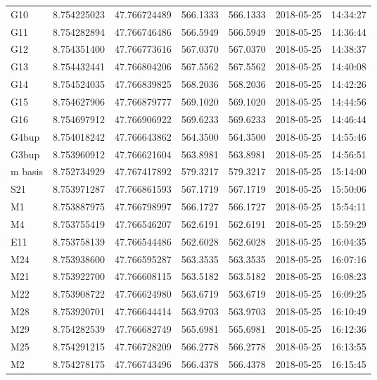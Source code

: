 \begin{table}[!ht]
\begin{tabular}{lllllll}
G10     & 8.754225023 & 47.766724489 & 566.1333 & 566.1333 & 2018-05-25 & 14:34:27 \\
G11     & 8.754282894 & 47.766746486 & 566.5949 & 566.5949 & 2018-05-25 & 14:36:44 \\
G12     & 8.754351400 & 47.766773616 & 567.0370 & 567.0370 & 2018-05-25 & 14:38:37 \\
G13     & 8.754432441 & 47.766804206 & 567.5562 & 567.5562 & 2018-05-25 & 14:40:08 \\
G14     & 8.754524035 & 47.766839825 & 568.2036 & 568.2036 & 2018-05-25 & 14:42:26 \\
G15     & 8.754627906 & 47.766879777 & 569.1020 & 569.1020 & 2018-05-25 & 14:44:56 \\
G16     & 8.754697912 & 47.766906922 & 569.6233 & 569.6233 & 2018-05-25 & 14:46:44 \\
G4bup   & 8.754018242 & 47.766643862 & 564.3500 & 564.3500 & 2018-05-25 & 14:55:46 \\
G3bup   & 8.753960912 & 47.766621604 & 563.8981 & 563.8981 & 2018-05-25 & 14:56:51 \\
m basis & 8.752734929 & 47.767417892 & 579.3217 & 579.3217 & 2018-05-25 & 15:14:00 \\
S21     & 8.753971287 & 47.766861593 & 567.1719 & 567.1719 & 2018-05-25 & 15:50:06 \\
M1      & 8.753887975 & 47.766798997 & 566.1727 & 566.1727 & 2018-05-25 & 15:54:11 \\
M4      & 8.753755419 & 47.766546207 & 562.6191 & 562.6191 & 2018-05-25 & 15:59:29 \\
E11     & 8.753758139 & 47.766544486 & 562.6028 & 562.6028 & 2018-05-25 & 16:04:35 \\
M24     & 8.753938600 & 47.766595287 & 563.3535 & 563.3535 & 2018-05-25 & 16:07:16 \\
M21     & 8.753922700 & 47.766608115 & 563.5182 & 563.5182 & 2018-05-25 & 16:08:23 \\
M22     & 8.753908722 & 47.766624980 & 563.6719 & 563.6719 & 2018-05-25 & 16:09:25 \\
M28     & 8.753920701 & 47.766644414 & 563.9703 & 563.9703 & 2018-05-25 & 16:10:49 \\
M29     & 8.754282539 & 47.766682749 & 565.6981 & 565.6981 & 2018-05-25 & 16:12:36 \\
M25     & 8.754291215 & 47.766728209 & 566.2778 & 566.2778 & 2018-05-25 & 16:13:55 \\
M2      & 8.754278175 & 47.766743496 & 566.4378 & 566.4378 & 2018-05-25 & 16:15:45 \\

\end{tabular}
\end{table}
